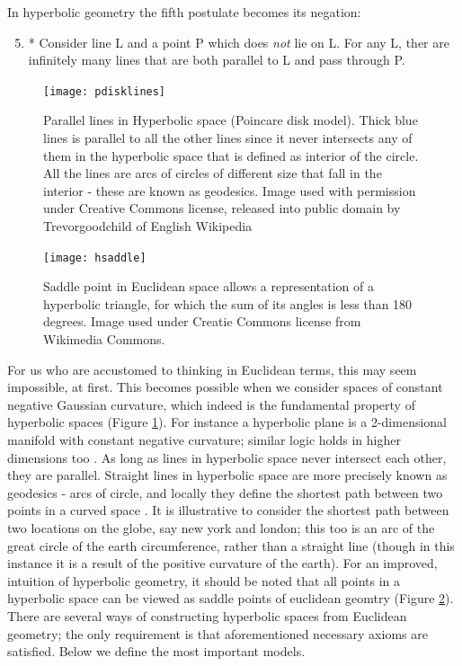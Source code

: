 \documentclass[12pt]{report}
\begin{document}
In hyperbolic geometry the fifth postulate becomes its negation: 

\begin{enumerate}
   \setcounter{enumi}{4}
   \item * Consider line L and a point P which does \textit{not} lie on L. For any L, ther are infinitely many lines that are both parallel to L and pass through P.
 \end{enumerate}

\begin{figure}
  \centering
	\texttt{[image: pdisklines]}
	\caption{Parallel lines in Hyperbolic space (Poincare disk model). Thick blue lines is parallel to all the other lines since it never intersects any of them in the hyperbolic space that is defined as interior of the circle. All the lines are arcs of circles of different size that fall in the interior - these are known as geodesics. Image used with permission under Creative Commons license, released into public domain by Trevorgoodchild of English Wikipedia}
	\label{fig:disklines}
\end{figure}

\begin{figure}
  \centering
	\texttt{[image: hsaddle]}
	\caption{Saddle point in Euclidean space allows a representation of a hyperbolic triangle, for which the sum of its angles is less than 180 degrees. Image used under Creatie Commons license from Wikimedia Commons.}
	\label{fig:hsaddle}
\end{figure}

For us who are accustomed to thinking in Euclidean terms, this may seem impossible, at first. This becomes possible when we consider spaces of constant negative Gaussian curvature, which indeed is the fundamental property of hyperbolic spaces (Figure \ref{fig:disklines}). For instance a hyperbolic plane is a 2-dimensional manifold with constant negative curvature; similar logic holds in higher dimensions too \cite{Stillwell1991}. As long as lines in hyperbolic space never intersect each other, they are parallel. Straight lines in hyperbolic space are more precisely known as geodesics - arcs of circle, and locally they define the shortest path between two points in a curved space \cite{Stillwell1991}. It is illustrative to consider the shortest path between two locations on the globe, say new york and london; this too is an arc of the great circle of the earth circumference, rather than a straight line (though in this instance it is a result of the positive curvature of the earth). For an improved, intuition of hyperbolic geometry, it should be noted that all points in a hyperbolic space can be viewed as saddle points of euclidean geomtry (Figure \ref{fig:hsaddle}). There are several ways of constructing hyperbolic spaces from Euclidean geometry; the only requirement is that aforementioned necessary axioms are satisfied. Below we define the most important models.
\end{document}
